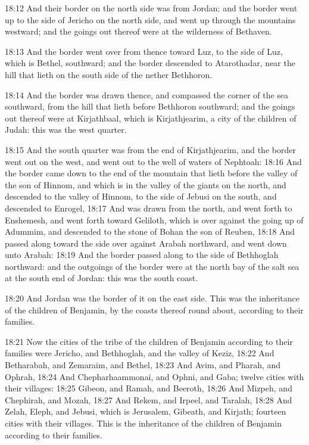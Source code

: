 18:12 And their border on the north side was from Jordan; and the border went up to the side of Jericho on the north side, and went up through the mountains westward; and the goings out thereof were at the wilderness of Bethaven.

18:13 And the border went over from thence toward Luz, to the side of Luz, which is Bethel, southward; and the border descended to Atarothadar, near the hill that lieth on the south side of the nether Bethhoron.

18:14 And the border was drawn thence, and compassed the corner of the sea southward, from the hill that lieth before Bethhoron southward; and the goings out thereof were at Kirjathbaal, which is Kirjathjearim, a city of the children of Judah: this was the west quarter.

18:15 And the south quarter was from the end of Kirjathjearim, and the border went out on the west, and went out to the well of waters of Nephtoah: 18:16 And the border came down to the end of the mountain that lieth before the valley of the son of Hinnom, and which is in the valley of the giants on the north, and descended to the valley of Hinnom, to the side of Jebusi on the south, and descended to Enrogel, 18:17 And was drawn from the north, and went forth to Enshemesh, and went forth toward Geliloth, which is over against the going up of Adummim, and descended to the stone of Bohan the son of Reuben, 18:18 And passed along toward the side over against Arabah northward, and went down unto Arabah: 18:19 And the border passed along to the side of Bethhoglah northward: and the outgoings of the border were at the north bay of the salt sea at the south end of Jordan: this was the south coast.

18:20 And Jordan was the border of it on the east side. This was the inheritance of the children of Benjamin, by the coasts thereof round about, according to their families.

18:21 Now the cities of the tribe of the children of Benjamin according to their families were Jericho, and Bethhoglah, and the valley of Keziz, 18:22 And Betharabah, and Zemaraim, and Bethel, 18:23 And Avim, and Pharah, and Ophrah, 18:24 And Chepharhaammonai, and Ophni, and Gaba; twelve cities with their villages: 18:25 Gibeon, and Ramah, and Beeroth, 18:26 And Mizpeh, and Chephirah, and Mozah, 18:27 And Rekem, and Irpeel, and Taralah, 18:28 And Zelah, Eleph, and Jebusi, which is Jerusalem, Gibeath, and Kirjath; fourteen cities with their villages. This is the inheritance of the children of Benjamin according to their families.

